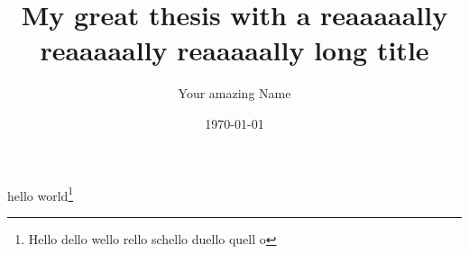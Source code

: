 \documentclass[
	verbose,
	english,
	type=bachelor-thesis, %
	paper=a4,  %
]{thesis}
\title{My great thesis with a reaaaaally reaaaaally reaaaaally long title}
\author{Your amazing Name}
\date{\today}
\begin{document}
\hideindraft{
	\frontmatter
		\maketitle
	
		
		
	
		\tableofcontents
		\listoffigures
		\listoftables
	}
	
	\mainmatter
	
	
	
	
	
	
	
	hello world\footnote{\the\marginparwidth Hello dello wello rello schello duello quell o} %

	\cite{DBLP:conf/msr/SihlerPSTDD24}

	\backmatter
	\printbibliography

	\makedeclarationofauthenticity %
\end{document}

